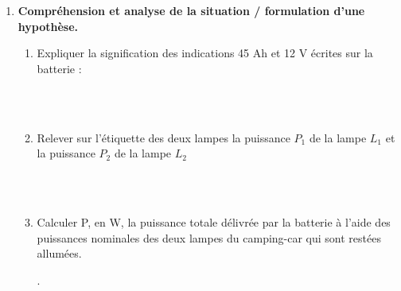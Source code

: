 \documentclass[11pt]{article}
\newcommand\SA{\marginpar{\scalebox{.8}{\framebox[1.6ex]{\rule{0ex}{1.6ex}\raisebox{.75ex}{\rule{1.6ex}{.5pt}}}\hspace{-.3pt}\framebox[3.2ex]{S}}}}
\newcommand\C{\marginpar{\scalebox{.8}{\framebox[1.6ex]{\rule{0ex}{1.6ex}\raisebox{.75ex}{\rule{1.6ex}{.5pt}}}\hspace{-.3pt}\framebox[3.2ex]{C}}}}
\begin{document}
 \begin{enumerate}
\item \textbf{Compréhension et analyse de la situation / formulation d'une hypothèse.}\\

\begin{enumerate}

\item Expliquer la signification des indications 45 Ah et 12 V écrites sur la batterie :

\begin{minipage}[c]{.91\linewidth}

\vspace{8mm}

    \dotfill\\

    \dotfill \\ 
    
  \end{minipage}\SA \C
\vspace{3mm}


\item Relever sur l'étiquette des deux lampes la puissance $P_1$ de la lampe $L_1$ et la puissance $P_2$ de la lampe $L_2$


\begin{minipage}[c]{.91\linewidth}

\vspace{8mm}

    \dotfill\\

    \dotfill \\ 
    
  \end{minipage}\SA \C
\vspace{3mm}

\item Calculer P, en W, la puissance totale délivrée par la batterie à l'aide des puissances nominales des deux lampes du camping-car qui sont restées allumées.  \\[5mm]
\begin{minipage}[c]{.91\linewidth}

    \vspace{8mm}
    
    .\dotfill\\
    
  \end{minipage}\SA


\vfill 


\newpage




\end{enumerate}
\end{enumerate}
\end{document}
